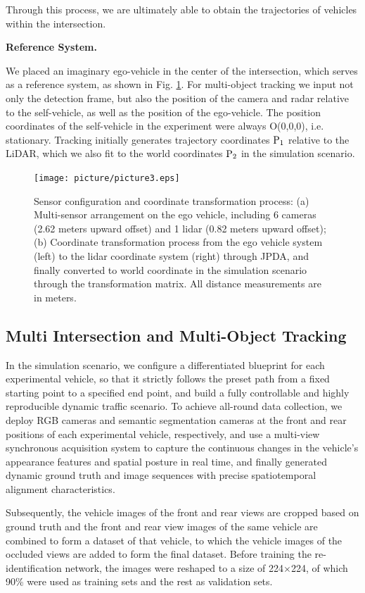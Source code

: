 \documentclass[journal,twoside,web]{ieeecolor}
\begin{document}
Through this process, we are ultimately able to obtain the trajectories of vehicles within the intersection.

\textbf{Reference System.}

We placed an imaginary ego-vehicle in the center of the intersection, which serves as a reference system, as shown in Fig. \ref{fig:3}. 
For multi-object tracking we input not only the detection frame, but also the position of the camera and radar relative to the self-vehicle, as well as the position of the ego-vehicle. 
The position coordinates of the self-vehicle in the experiment were always O(0,0,0), i.e. stationary. 
Tracking initially generates trajectory coordinates \(\text P_1\) relative to the LiDAR, which we also fit to the world coordinates \(\text P_2\) in the simulation scenario.
\begin{figure}[!t]
	\centerline{\texttt{[image: picture/picture3.eps]}}
	\caption{Sensor configuration and coordinate transformation process: (a) Multi-sensor arrangement on the ego vehicle, including 6 cameras (2.62 meters upward offset) and 1 lidar (0.82 meters upward offset); (b) Coordinate transformation process from the ego vehicle system (left) to the lidar coordinate system (right) through JPDA, and finally converted to world coordinate in the simulation scenario through the transformation matrix. All distance measurements are in meters.} 
	\label{fig:3} 
\end{figure}

\subsection{Multi Intersection and Multi-Object Tracking}

In the simulation scenario, we configure a differentiated blueprint for each experimental vehicle, so that it strictly follows the preset path from a fixed starting point to a specified end point, and build a fully controllable and highly reproducible dynamic traffic scenario.
To achieve all-round data collection, we deploy RGB cameras and semantic segmentation cameras at the front and rear positions of each experimental vehicle, respectively, and use a multi-view synchronous acquisition system to capture the continuous changes in the vehicle's appearance features and spatial posture in real time, and finally generated dynamic ground truth and image sequences with precise spatiotemporal alignment characteristics.

Subsequently, the vehicle images of the front and rear views are cropped based on ground truth and the front and rear view images of the same vehicle are combined to form a dataset of that vehicle, to which the vehicle images of the occluded views are added to form the final dataset.
Before training the re-identification network, the images were reshaped to a size of 224\(\times\)224, of which 90\% were used as training sets and the rest as validation sets.
\end{document}
